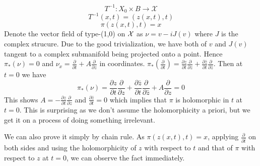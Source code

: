 \documentclass{article}
\begin{document}
\[T^{-1}: X_0\times B \to \mathcal{X}\]
\[T^{-1}(x,t)=(z(x,t),t)\]
\[\pi(z(x,t),t)=x\]
Denote the vector field of type-(1,0) on $\mathcal{X}$ as $\nu=v-iJ(v)$ where $J$ is the complex strucure. Due to the good trivialization, we have both of $v$ and $J(v)$ tangent to a complex submanifold being projected onto a point. Hence $\pi_*(\nu)=0$ and $\nu_x=\frac{\partial}{\partial{t}}+ A\frac{\partial}{\partial{z}}$ in coordinates. $\pi_*({\frac{\partial}{\partial t}})=\frac{\partial z}{\partial t}\frac{\partial}{\partial z}+\frac{\partial \bar{z}}{\partial t}\frac{\partial}{\partial \bar{z}}$. Then at $t=0$ we have
\[\pi_*(\nu)=\frac{\partial z}{\partial t}\frac{\partial}{\partial z}+\frac{\partial \bar{z}}{\partial t}\frac{\partial}{\partial \bar{z}}+A\frac{\partial}{\partial{z}}=0\]
This shows $A=-\frac{\partial z}{\partial t}\frac{\partial}{\partial z}$ and $\frac{\partial \bar{z}}{\partial t}=0$ which implies that $\pi$ is holomorphic in $t$ at $t=0$. This is surprising as we don't assume the holomorphicity a priori, but we get it on a process of doing something irrelevant.

We can also prove it simply by chain rule. As $\pi(z(x,t),t)=x$, applying $\frac{\partial}{\partial \bar{t}}$ on both sides and using the holomorphicity of $z$ with respect to $t$ and that of $\pi$ with respect to $z$ at $t=0$, we can observe the fact immediately. 
\end{document}
